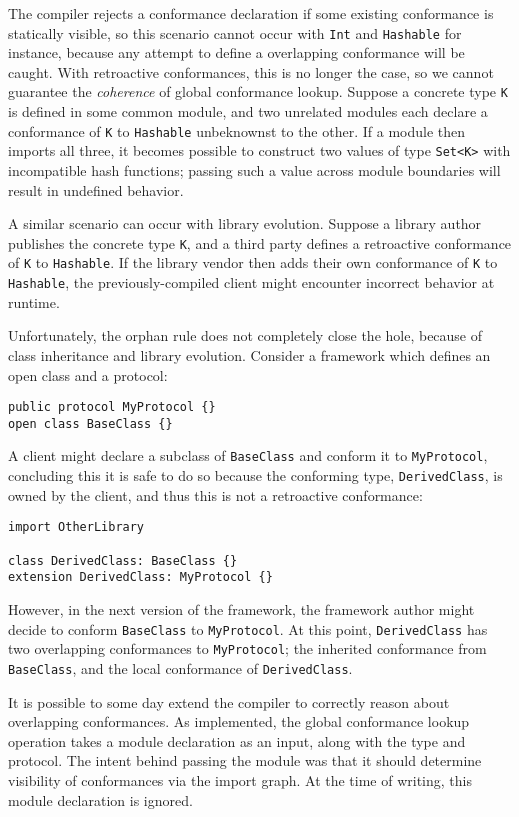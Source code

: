 \documentclass[../generics]{subfiles}
\begin{document}
The compiler rejects a conformance declaration if some existing conformance is statically visible, so this scenario cannot occur with \texttt{Int} and \texttt{Hashable} for instance, because any attempt to define a overlapping conformance will be caught. With retroactive conformances, this is no longer the case, so we cannot guarantee the \emph{coherence} of global conformance lookup. Suppose a concrete type \texttt{K} is defined in some common module, and two unrelated modules each declare a conformance of \texttt{K} to \texttt{Hashable} unbeknownst to the other. If a module then imports all three, it becomes possible to construct two values of type \texttt{Set<K>} with incompatible hash functions; passing such a value across module boundaries will result in undefined behavior.

A similar scenario can occur with library evolution. Suppose a library author publishes the concrete type \texttt{K}, and a third party defines a retroactive conformance of \texttt{K} to \texttt{Hashable}. If the library vendor then adds their own conformance of \texttt{K} to \texttt{Hashable}, the previously-compiled client might encounter incorrect behavior at runtime.

Unfortunately, the orphan rule does not completely close the hole, because of class inheritance and library evolution. Consider a framework which defines an open class and a protocol:
\begin{Verbatim}
public protocol MyProtocol {}
open class BaseClass {}
\end{Verbatim}
A client might declare a subclass of \texttt{BaseClass} and conform it to \texttt{MyProtocol}, concluding this it is safe to do so because the conforming type, \texttt{DerivedClass}, is owned by the client, and thus this is not a retroactive conformance:
\begin{Verbatim}
import OtherLibrary

class DerivedClass: BaseClass {}
extension DerivedClass: MyProtocol {}
\end{Verbatim}
However, in the next version of the framework, the framework author might decide to conform \texttt{BaseClass} to \texttt{MyProtocol}. At this point, \texttt{DerivedClass} has two overlapping conformances to \texttt{MyProtocol}; the inherited conformance from \texttt{BaseClass}, and the local conformance of \texttt{DerivedClass}.

It is possible to some day extend the compiler to correctly reason about overlapping conformances. As implemented, the global conformance lookup operation takes a module declaration as an input, along with the type and protocol. The intent behind passing the module was that it should determine visibility of conformances via the import graph. At the time of writing, this module declaration is ignored.
\end{document}
